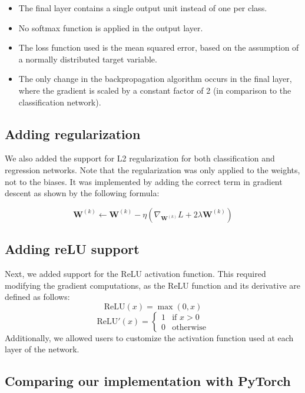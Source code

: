 \documentclass[9pt]{IEEEtran}
\begin{document}
\begin{itemize}
    \item The final layer contains a single output unit instead of one per class.
    \item No softmax function is applied in the output layer.
    \item The loss function used is the mean squared error, based on the assumption of a normally distributed target variable.
    \item The only change in the backpropagation algorithm occurs in the final layer, where the gradient is scaled by a constant factor of 2 (in comparison to the classification network).
\end{itemize}

\subsection{Adding regularization}
We also added the support for L2 regularization for both classification and regression networks. 
Note that the regularization was only applied to the weights, not to the biases.
It was implemented by adding the correct term in gradient descent
  as shown by the following formula:

\[
\mathbf{W}^{(k)} \leftarrow \mathbf{W}^{(k)} - \eta \left( \nabla_{\mathbf{W}^{(k)}} L + 2\lambda \mathbf{W}^{(k)} \right)
\]

\subsection{Adding reLU support}
Next, we added support for the ReLU activation function. This required modifying the gradient computations, as the ReLU function and its derivative are defined as follows:
\[
\text{ReLU}(x) = \max(0, x)
\]
\[
\text{ReLU}'(x) =
\begin{cases}
1 & \text{if } x > 0 \\
0 & \text{otherwise}
\end{cases}
\]
Additionally, we allowed users to customize the activation function used at each layer of the network.

\subsection{Comparing our implementation with PyTorch}



\end{document}

